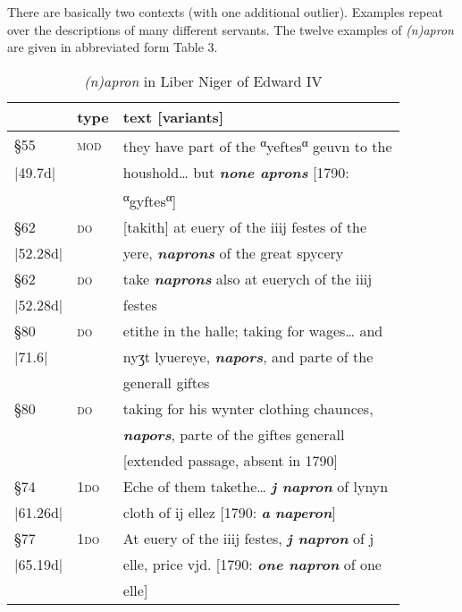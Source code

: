 \documentclass[output=paper,
modfonts
]{LSP/langsci}
\begin{document}
There are basically two contexts (with one additional outlier). Examples
repeat over the descriptions of many different servants. The twelve
examples of \emph{(n)apron} are given in abbreviated form Table 3.

\begin{table}[ht]
\centering\caption{\emph{(n)apron} in Liber Niger of Edward IV}
\begin{tabular}{lll}
\lsptoprule
& type & text {[}variants{]}\\
\midrule
§55	&	\textsc{mod}	&	they have part of the
\textsuperscript{α}yeftes\textsuperscript{α} geuvn to the  \\
|49.7d| & &  houshold\ldots{} but \textbf{\emph{none aprons}} {[}1790: \\
	 & & 	\textsuperscript{α}gyftes\textsuperscript{α}{]} \\

§62 &	\textsc{do}		&	{[}takith{]} at euery of the iiij festes of the \\
|52.28d| & & yere, \emph{\textbf{naprons}} of the great spycery \\

§62 & 	\textsc{do}		&	take \emph{\textbf{naprons}} also at euerych of the iiij \\
|52.28d| &	& festes \\

§80 &	\textsc{do}		&	etithe in the halle; taking for wages\ldots{} and \\
|71.6| & & nyʒt lyuereye, \emph{\textbf{napors}}, and parte of the\\
	& & generall giftes \\

§80 & 	\textsc{do}		&	taking for his wynter clothing chaunces, \\
	& & \emph{\textbf{napors}}, parte of the giftes generall \\
	& &  {[}extended passage, absent in 1790{]}\\

§74 &	\textsc{1do}	&	 Eche of them takethe\ldots{} \emph{\textbf{j napron}} of lynyn \\
|61.26d| & & cloth of ij ellez {[}1790: \emph{\textbf{a} \textbf{naperon}}{]} \\

§77 &	\textsc{1do}	 &	At euery of the iiij festes, \emph{\textbf{j napron}} of j \\
|65.19d| & & elle, price vjd. {[}1790: \emph{\textbf{one napron}} of one\\
	& & 	elle{]}\\


\end{tabular}
\end{table}
\end{document}
